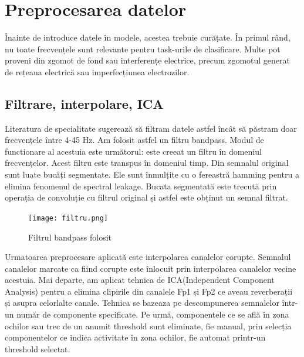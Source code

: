\section{Preprocesarea datelor}
Înainte de introduce datele în modele, acestea trebuie curățate. În primul rând, nu toate frecvențele sunt relevante pentru task-urile de clasificare. Multe pot proveni din zgomot de fond sau interferențe electrice, precum zgomotul generat de rețeaua electrică sau imperfecțiunea electrozilor. 




\subsection{Filtrare, interpolare, ICA}

Literatura de specialitate sugerează să filtram datele astfel încât să păstram doar frecvențele între 4-45 Hz. Am folosit astfel un filtru bandpass. Modul de functionare al acestuia este următorul: este creeat un filtru în domeniul frecvențelor. Acest filtru este transpus în domeniul timp. Din semnalul original sunt luate bucăți segmentate. Ele sunt înmulțite cu o fereastră hamming pentru a elimina fenomenul de spectral leakage. Bucata segmentată este trecută prin operația de convoluție cu filtrul original și astfel este obținut un semnal filtrat.

\setlength{\abovecaptionskip}{0pt}
\setlength{\belowcaptionskip}{0pt}
\clearpage
\begin{figure}[h]
    \centering
    \texttt{[image: filtru.png]}
    \caption{Filtrul bandpass folosit}
    \label{fig:vizualizare_filtru}
\end{figure}

Urmatoarea preprocesare aplicată este interpolarea canalelor corupte. Semnalul canalelor marcate ca fiind corupte este înlocuit prin interpolarea canalelor vecine acestuia. Mai departe, am aplicat tehnica de ICA(Independent Component Analysis) pentru a elimina clipirile din canalele Fp1 și Fp2 ce aveau reverberații și asupra celorlalte canale. Tehnica se bazeaza pe descompunerea semnalelor într-un număr de componente specificate. Pe urmă, componentele ce se află în zona ochilor sau trec de un anumit threshold sunt eliminate, fie manual, prin selecția componentelor ce indica activitate în zona ochilor, fie automat printr-un threshold selectat.

